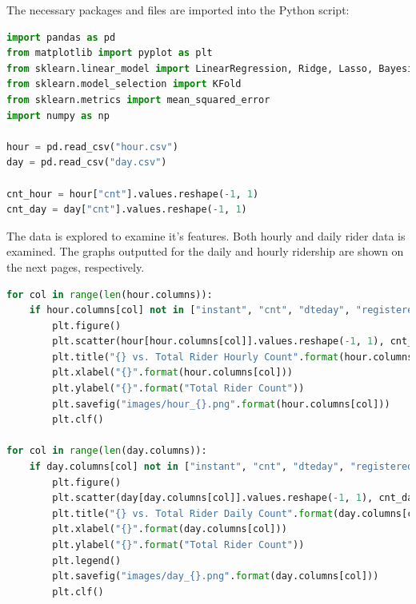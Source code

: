 \documentclass{homework}
\begin{document}
\begin{solution}
\begin{solution}

The necessary packages and files are imported into the Python script: 

\begin{lstlisting}[language=Python, firstnumber=10]
import pandas as pd
from matplotlib import pyplot as plt
from sklearn.linear_model import LinearRegression, Ridge, Lasso, BayesianRidge
from sklearn.model_selection import KFold
from sklearn.metrics import mean_squared_error
import numpy as np

hour = pd.read_csv("hour.csv")
day = pd.read_csv("day.csv")

cnt_hour = hour["cnt"].values.reshape(-1, 1)
cnt_day = day["cnt"].values.reshape(-1, 1)
\end{lstlisting}

The data is explored to examine it's features. Both hourly and daily rider data is examined. The graphs outputted for the daily and hourly ridership are shown on the next pages, respectively. 

\begin{lstlisting}[language=Python]
for col in range(len(hour.columns)):
    if hour.columns[col] not in ["instant", "cnt", "dteday", "registered", "casual"]:
        plt.figure()
        plt.scatter(hour[hour.columns[col]].values.reshape(-1, 1), cnt_hour)
        plt.title("{} vs. Total Rider Hourly Count".format(hour.columns[col]))
        plt.xlabel("{}".format(hour.columns[col]))
        plt.ylabel("{}".format("Total Rider Count"))
        plt.savefig("images/hour_{}.png".format(hour.columns[col]))
        plt.clf()

for col in range(len(day.columns)):
    if day.columns[col] not in ["instant", "cnt", "dteday", "registered", "casual"]:
        plt.figure()
        plt.scatter(day[day.columns[col]].values.reshape(-1, 1), cnt_day)
        plt.title("{} vs. Total Rider Daily Count".format(day.columns[col]))
        plt.xlabel("{}".format(day.columns[col]))
        plt.ylabel("{}".format("Total Rider Count"))
        plt.legend()
        plt.savefig("images/day_{}.png".format(day.columns[col]))
        plt.clf()
\end{lstlisting}


\end{solution}
\end{solution}
\end{document}
